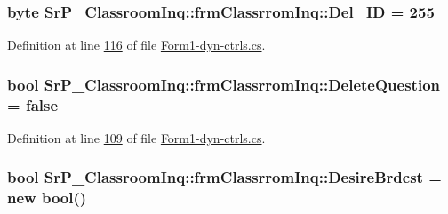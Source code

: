 \hypertarget{class_sr_p___classroom_inq_1_1frm_classrrom_inq_a9874b3534409b79a483f08f2aa03668d}{
\subsubsection[{\-Del\-\_\-\-I\-D}]{\setlength{\rightskip}{0pt plus 5cm}byte {\bf \-Sr\-P\-\_\-\-Classroom\-Inq\-::frm\-Classrrom\-Inq\-::\-Del\-\_\-\-I\-D} = 255}}
\label{class_sr_p___classroom_inq_1_1frm_classrrom_inq_a9874b3534409b79a483f08f2aa03668d}


\-Definition at line \hyperlink{_form1-dyn-ctrls_8cs_source_l00116}{116} of file \hyperlink{_form1-dyn-ctrls_8cs_source}{\-Form1-\/dyn-\/ctrls.\-cs}.

\hypertarget{class_sr_p___classroom_inq_1_1frm_classrrom_inq_ab3a8803fac827da5757e7451c1836010}{
\subsubsection[{\-Delete\-Question}]{\setlength{\rightskip}{0pt plus 5cm}bool {\bf \-Sr\-P\-\_\-\-Classroom\-Inq\-::frm\-Classrrom\-Inq\-::\-Delete\-Question} = false}}
\label{class_sr_p___classroom_inq_1_1frm_classrrom_inq_ab3a8803fac827da5757e7451c1836010}


\-Definition at line \hyperlink{_form1-dyn-ctrls_8cs_source_l00109}{109} of file \hyperlink{_form1-dyn-ctrls_8cs_source}{\-Form1-\/dyn-\/ctrls.\-cs}.

\hypertarget{class_sr_p___classroom_inq_1_1frm_classrrom_inq_ab67298a2e18c70080e8cc5e604223679}{
\subsubsection[{\-Desire\-Brdcst}]{\setlength{\rightskip}{0pt plus 5cm}bool {\bf \-Sr\-P\-\_\-\-Classroom\-Inq\-::frm\-Classrrom\-Inq\-::\-Desire\-Brdcst} = new bool()}}
\label{class_sr_p___classroom_inq_1_1frm_classrrom_inq_ab67298a2e18c70080e8cc5e604223679}


